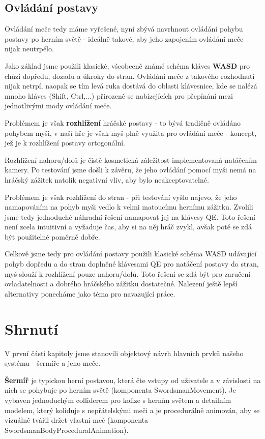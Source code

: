 \pagebreak

\subsection{Ovládání postavy}

Ovládání meče tedy máme vyřešené, nyní zbývá navrhnout ovládání pohybu postavy po herním světě - ideálně takové, aby jeho zapojením ovládání meče nijak neutrpělo. 

Jako základ jsme použili klasické, všeobecně známé schéma kláves \textbf{WASD} pro chůzi dopředu, dozadu a úkroky do stran. Ovládání meče z takového rozhodnutí nijak netrpí, naopak se tím levá ruka dostává do oblasti klávesnice, kde se nalézá mnoho kláves (Shift, Ctrl,...) přirozeně se nabízejících pro přepínání mezi jednotlivými mody ovládání meče.

Problémem je však \textbf{rozhlížení} hráčské postavy - to bývá tradičně ovládáno pohybem myši, v naší hře je však myš plně využita pro ovládání meče - koncept, jež je k rozhlížení postavy ortogonální. 

Rozhlížení nahoru/dolů je čistě kosmetická záležitost implementovaná natáčením kamery. Po testování jsme došli k závěru, že jeho ovládání pomocí myši nemá na hráčský zážitek natolik negativní vliv, aby bylo neakceptovatelné. 

Problémem je však rozhlížení do stran - při testování vyšlo najevo, že jeho namapováním na pohyb myši vedlo k velmi matoucímu hernímu zážitku. Zvolili jsme tedy jednoduché náhradní řešení namapovat jej na klávesy QE. Toto řešení není zcela intuitivní a vyžaduje čas, aby si na něj hráč zvykl, avšak poté se zdá být použitelné poměrně dobře.

\bigbreak
Celkově jsme tedy pro ovládání postavy použili klasické schéma WASD udávající pohyb dopředu a do stran doplněné klávesami QE pro natáčení postavy do stran, myš slouží k rozhlížení pouze nahoru/dolů. Toto řešení se zdá být pro zaručení ovladatelnosti a dobrého hráčského zážitku dostatečné. Nalezení ještě lepší alternativy ponecháme jako téma pro navazující práce.

\section{Shrnutí}

V první části kapitoly jsme stanovili objektový návrh hlavních prvků našeho systému - šermíře a jeho meče. 

\textbf{Šermíř} je typickou herní postavou, která čte vstupy od uživatele a v závislosti na nich se pohybuje po herním světě (komponenta SwordsmanMovement). Je vybaven jednoduchým colliderem pro kolize s herním světem a detailním modelem, který koliduje s nepřátelskými meči a je procedurálně animován, aby se vizuálně tvářil držet vlastní meč (komponenta SwordsmanBodyProceduralAnimation). 

